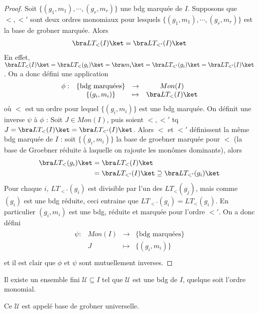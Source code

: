         \begin{proof}
            Soit $\{(g_1,m_1), \cdots, (g_r,m_r)\}$ une bdg marquée de $I$. Supposons que $<, <'$ sont deux ordres monomiaux pour lesquels $\{(g_1, m_1), \cdots, (g_r, m_r)\}$ est la base de grobner marquée. Alors
            \begin{align*}
                \bra LT_<(I) \ket = \bra LT_{<'}(I) \ket
            \end{align*}
            En effet, $\bra LT_<(I) \ket = \bra LT_<(g_i) \ket = \bra m_i \ket = \bra LT_{<'}(g_i) \ket = \bra LT_{<'}(I) \ket$. On a donc défini une application
            \begin{align*}
                \begin{array}{cccc}
                    \phi : & \{\text{bdg marquées}\} & \to & Mon(I) \\
                    & \{(g_i,m_i)\} & \mapsto & \bra LT_<(I) \ket \\
                \end{array}
            \end{align*}
            où $<$ est un ordre pour lequel $\{(g_i, m_i)\}$ est une bdg marquée. On définit une inverse $\psi$ à $\phi$ : Soit $J \in Mon(I)$, puis soient $<, <'$ tq $J = \bra LT_<(I) \ket = \bra LT_{<'}(I) \ket$. Alors $<$ et $<'$ définissent la même bdg marquée de $I$ : soit $\{(g_i,m_i)\}$ la base de groebner marquée pour $<$ (la base de Groebner réduite à laquelle on rajoute les monômes dominants), alors
            \begin{align*}
                \bra LT_<(g_i) \ket &= \bra LT_<(I) \ket \\
                &= \bra LT_{<'}(I) \ket \supseteq \bra LT_{<'}(g_i) \ket
            \end{align*}
            Pour chaque $i$, $LT_{<'}(g_i)$ est divisible par l'un des $LT_<(g_j)$, mais comme $(g_i)$ est une bdg réduite, ceci entraine que $LT_{<'}(g_i) = LT_<(g_i)$. En particulier $(g_i, m_i)$ est une bdg, réduite et marquée pour l'ordre $<'$. On a donc défini
            \begin{align*}
                \begin{array}{cccc}
                    \psi : & Mon(I) & \to & \{\text{bdg marquées}\} \\
                    & J & \mapsto & \{(g_i, m_i)\}\\
                \end{array}
            \end{align*}
            et il est clair que $\phi$ et $\psi$ sont mutuellement inverses.
        \end{proof}
        \begin{coro}
            Il existe un ensemble fini $\mathcal{U} \subseteq I$ tel que $\mathcal{U}$ est une bdg de $I$, quelque soit l'ordre monomial.
        \end{coro}
        \begin{defi}
            Ce $\mathcal{U}$ est appelé base de grobner universelle.
        \end{defi}

